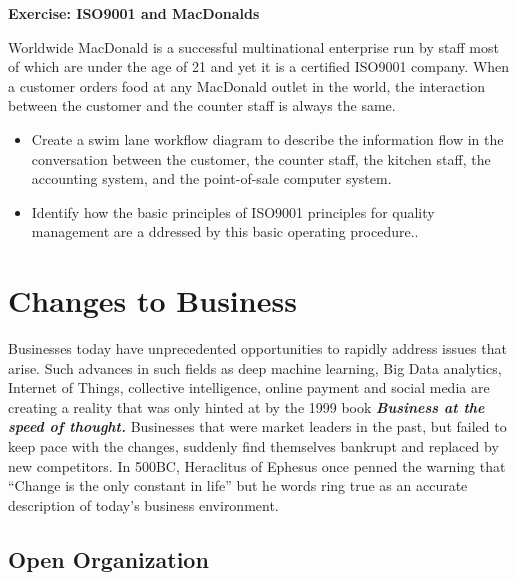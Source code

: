 \documentclass[]{book}
\providecommand{\tightlist}{%
  \setlength{\itemsep}{0pt}\setlength{\parskip}{0pt}}
\let\BeginKnitrBlock\begin \let\EndKnitrBlock\end
\begin{document}
\BeginKnitrBlock{rmdexercise}
\textbf{Exercise: ISO9001 and MacDonalds}

Worldwide MacDonald is a successful multinational enterprise run by staff most of which are under the age of 21 and yet it is a certified ISO9001 company. When a customer orders food at any MacDonald outlet in the world, the interaction between the customer and the counter staff is always the same.

\begin{itemize}
\tightlist
\item
  Create a swim lane workflow diagram to describe the information flow in the conversation between the customer, the counter staff, the kitchen staff, the accounting system, and the point-of-sale computer system.
\item
  Identify how the basic principles of ISO9001 principles for quality management are a ddressed by this basic operating procedure..
\end{itemize}
\EndKnitrBlock{rmdexercise}

\hypertarget{changes-to-business}{%
\section{Changes to Business}\label{changes-to-business}}

Businesses today have unprecedented opportunities to rapidly address issues that arise. Such advances in such fields as deep machine learning, Big Data analytics, Internet of Things, collective intelligence, online payment and social media are creating a reality that was only hinted at by the 1999 book \textbf{\emph{Business at the speed of thought.}} \citep{Gates1999} Businesses that were market leaders in the past, but failed to keep pace with the changes, suddenly find themselves bankrupt and replaced by new competitors. In 500BC, Heraclitus of Ephesus once penned the warning that ``Change is the only constant in life'' but he words ring true as an accurate description of today's business environment.

\hypertarget{open-organization}{%
\subsection{Open Organization}\label{open-organization}}
\end{document}
